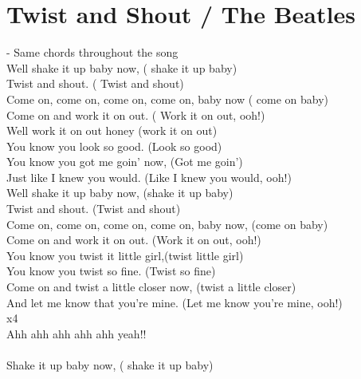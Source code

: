 \section{Twist and Shout / The Beatles}\label{sec:twistandshout}
\Dmajor
\Gmajor
\Aseven

   - Same chords throughout the song\\
Well shake it up baby  now, ( shake it up  baby)\\
Twist and  shout. ( Twist and  shout)\\
Come on, come on, come on, come on,  baby now ( come on  baby)\\
Come on and work it on  out. ( Work it on  out, ooh!)\\

Well work it on out honey (work it on out)\\
You know you look so good. (Look so good)\\
You know you got me goin’ now, (Got me goin’)\\
Just like I knew you would. (Like I knew you would, ooh!)\\

Well shake it up baby now, (shake it up baby)\\
Twist and shout. (Twist and shout)\\
Come on, come on, come on, come on, baby now, (come on baby)\\
Come on and work it on out. (Work it on out, ooh!)\\

You know you twist it little girl,(twist little girl)\\
You know you twist so fine. (Twist so fine)\\
Come on and twist a little closer now, (twist a little closer)\\
And let me know that you’re mine. (Let me know you’re mine, ooh!)\\

    x4\\
 Ahh ahh  ahh ahh ahh yeah!!\\

  \\

Shake it up baby  now, ( shake it up  baby)\\

